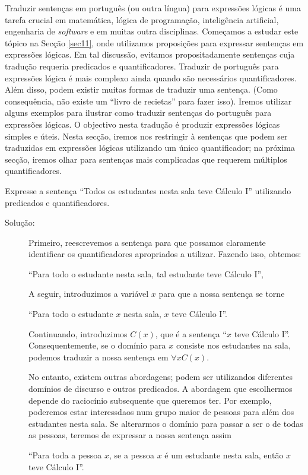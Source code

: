 Traduzir sentenças em português (ou outra língua) para expressões lógicas é
uma tarefa crucial em matemática, lógica de programação, inteligência
artificial, engenharia de \emph{software} e em muitas outra disciplinas.
Começamos a estudar este tópico na Secção \ref{sec11}, onde utilizamos
proposições para expressar sentenças em expressões lógicas. Em tal discussão,
evitamos propositadamente sentenças cuja tradução requeria predicados e
quantificadores. Traduzir de português para expressões lógica é mais complexo
ainda quando são necessários quantificadores. Além disso, podem existir muitas
formas de traduzir uma sentença. (Como consequência, não existe um ``livro de
recietas'' para fazer isso). Iremos utilizar alguns exemplos para ilustrar como
traduzir sentenças do português para expressões lógicas. O objectivo nesta
tradução é produzir expressões lógicas simples e úteis. Nesta secção, iremos nos
restringir à sentenças que podem ser traduzidas em expressões lógicas utilizando
um único quantificador; na próxima secção, iremos olhar para sentenças mais
complicadas que requerem múltiplos quantificadores.

\begin{exmp}
\label{exem146}
Expresse a sentença ``Todos os estudantes nesta sala teve Cálculo I''
utilizando predicados e quantificadores.
\begin{description}
\item[Solução:]Primeiro, reescrevemos a sentença para que possamos claramente
identificar os quantificadores apropriados a utilizar. Fazendo isso, obtemos:
\begin{center}
``Para todo o estudante nesta sala, tal estudante teve Cálculo I'',
\end{center}
A seguir, introduzimos a variável $x$ para que a nossa sentença se torne
\begin{center}
``Para todo o estudante $x$ nesta sala, $x$ teve Cálculo I''.
\end{center}

Continuando, introduzimos $C(x)$, que é a sentença ``$x$ teve Cálculo I''.
Consequentemente, se o domínio para $x$ consiste nos estudantes na sala, podemos
traduzir a nossa sentença em $\forall xC(x)$.

No entanto, existem outras abordagens; podem ser utilizandos diferentes domínios
de discurso e outros predicados. A abordagem que escolhermos depende do
raciocínio subsequente que queremos ter. Por exemplo, poderemos estar
interessdaos num grupo maior de pessoas para além dos estudantes nesta sala. Se
alterarmos o domínio para passar a ser o de todas as pessoas, teremos de
expressar a nossa sentença assim

\begin{center}
``Para toda a pessoa $x$, se a pessoa $x$ é um estudante nesta sala, então $x$
teve Cálculo I''.
\end{center}
\end{description}
\end{exmp}


